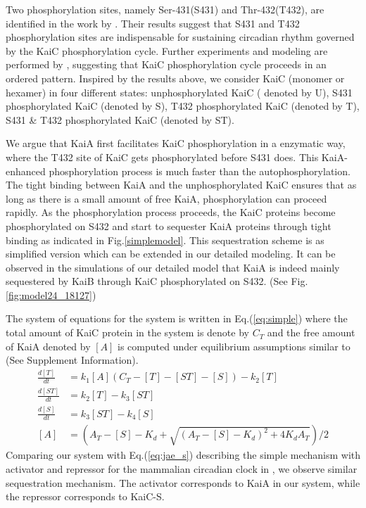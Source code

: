 \documentclass[a4paper,10pt]{article}
\numberwithin{equation}{section}
\begin{document}
Two phosphorylation sites, namely Ser-431(S431) and Thr-432(T432), are identified in the work by \citet{nishiwaki2004}. Their results suggest that S431 and T432 phosphorylation sites are indispensable for sustaining circadian rhythm governed by the KaiC phosphorylation cycle. Further experiments and modeling are performed by \citet{rust809}, suggesting that KaiC phosphorylation cycle proceeds in an ordered pattern. Inspired by the results above, we consider KaiC (monomer or hexamer) in four different states: unphosphorylated KaiC ( denoted by U), S431 phosphorylated KaiC (denoted by S), T432 phosphorylated KaiC (denoted by T), S431 \& T432 phosphorylated KaiC (denoted by ST).

We argue that KaiA first facilitates KaiC phosphorylation in a enzymatic way, where the T432 site of KaiC gets phosphorylated before S431 does. This KaiA-enhanced phosphorylation process is much faster than the autophosphorylation. The tight binding between KaiA and the unphosphorylated KaiC ensures that as long as there is a small amount of free KaiA, phosphorylation can proceed rapidly. As the phosphorylation process proceeds, the KaiC proteins become phosphorylated on S432 and start to sequester KaiA proteins through tight binding as indicated in Fig.\ref{simplemodel}. This sequestration scheme is as simplified version which can be extended in our detailed modeling. It can be observed in the simulations of our detailed model that KaiA is indeed mainly sequestered by KaiB through KaiC phosphorylated on S432. (See Fig. \ref{fig:model24_18127})

The system of equations for the system is written in Eq.(\ref{eq:simple}) where the total amount of KaiC protein in the system is denote by $C_T$ and the free amount of KaiA denoted by $[A]$ is computed under equilibrium assumptions similar to \citet{forger2012} (See Supplement Information). 
\begin{equation}\label{eq:simple} 
\begin{aligned}
\frac{d[T]}{dt}&=k_1 [A] (C_T-[T]-[ST]-[S])-k_2 [T]\\
\frac{d[ST]}{dt}&=k_2 [T]-k_3 [ST]\\
\frac{d[S]}{dt}&=k_3 [ST]-k_4 [S]\\
[A]&=\left(A_T-[S]-K_d+\sqrt{(A_T-[S]-K_d)^2+4K_dA_T}\right)/2
\end{aligned}
\end{equation}
Comparing our system with Eq.(\ref{eq:jae_s}) describing the simple mechanism with activator and repressor for the mammalian circadian clock in \citet{forger2012}, we observe similar sequestration mechanism. The activator corresponds to KaiA in our system, while the repressor corresponds to KaiC-S.  
\end{document}
